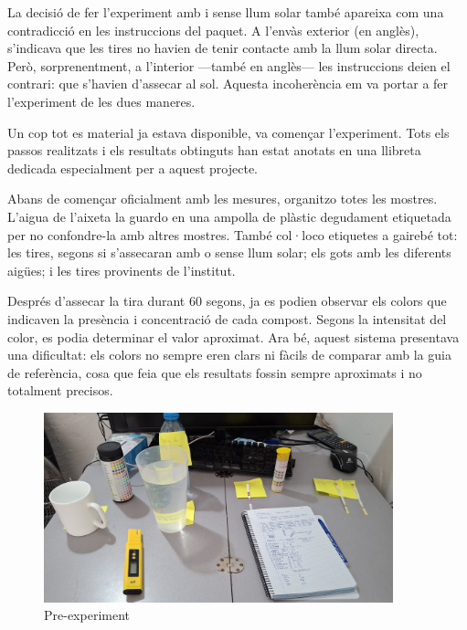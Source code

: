 La decisió de fer l'experiment amb i sense llum solar també apareixa com una contradicció en les instruccions del paquet. A l’envàs exterior (en anglès), s’indicava que les tires no havien de tenir contacte amb la llum solar directa. Però, sorprenentment, a l’interior —també en anglès— les instruccions deien el contrari: que s’havien d’assecar al sol. Aquesta incoherència em va portar a fer l’experiment de les dues maneres.


Un cop tot es material ja estava disponible, va començar l'experiment. Tots els passos realitzats i els resultats obtinguts han estat anotats en una llibreta dedicada especialment per a aquest projecte.

Abans de començar oficialment amb les mesures, organitzo totes les mostres. L’aigua de l’aixeta la guardo en una ampolla de plàstic degudament etiquetada per no confondre-la amb altres mostres. També col·loco etiquetes a gairebé tot: les tires, segons si s’assecaran amb o sense llum solar; els gots amb les diferents aigües; i les tires provinents de l’institut.

Després d’assecar la tira durant 60 segons, ja es podien observar els colors que indicaven la presència i concentració de cada compost. Segons la intensitat del color, es podia determinar el valor aproximat. Ara bé, aquest sistema presentava una dificultat: els colors no sempre eren clars ni fàcils de comparar amb la guia de referència, cosa que feia que els resultats fossin sempre aproximats i no totalment precisos.

\begin{figure}[h!]
\centering
\includegraphics[width=0.9\textwidth, angle=0]{./Figures/expe.png}
\caption{Pre-experiment }
\label{fig:fotoPreExperiment}
\end{figure}

